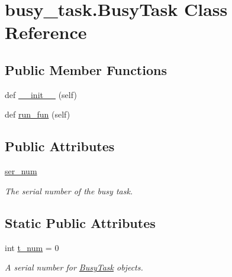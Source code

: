 \hypertarget{classbusy__task_1_1_busy_task}{}\section{busy\+\_\+task.\+Busy\+Task Class Reference}
\label{classbusy__task_1_1_busy_task}
\subsection*{Public Member Functions}
\begin{DoxyCompactItemize}
\item 
def \mbox{\hyperlink{classbusy__task_1_1_busy_task_a091266e3c8c477e726f8dadc7c559bc0}{\+\_\+\+\_\+init\+\_\+\+\_\+}} (self)
\item 
def \mbox{\hyperlink{classbusy__task_1_1_busy_task_a59bba8eef73ceb08cbf6969b7e18ffba}{run\+\_\+fun}} (self)
\end{DoxyCompactItemize}
\subsection*{Public Attributes}
\begin{DoxyCompactItemize}
\item 
\mbox{\label{classbusy__task_1_1_busy_task_af53958cbae373b09231fc4fa8e51fe3b}} 
\mbox{\hyperlink{classbusy__task_1_1_busy_task_af53958cbae373b09231fc4fa8e51fe3b}{ser\+\_\+num}}
\begin{DoxyCompactList}\small\item\em The serial number of the busy task. \end{DoxyCompactList}\end{DoxyCompactItemize}
\subsection*{Static Public Attributes}
\begin{DoxyCompactItemize}
\item 
int \mbox{\hyperlink{classbusy__task_1_1_busy_task_a7d7e9e88981c6107ea8d652f8c2f3988}{t\+\_\+num}} = 0
\begin{DoxyCompactList}\small\item\em A serial number for {\ttfamily \mbox{\hyperlink{classbusy__task_1_1_busy_task}{Busy\+Task}}} objects. \end{DoxyCompactList}\end{DoxyCompactItemize}



